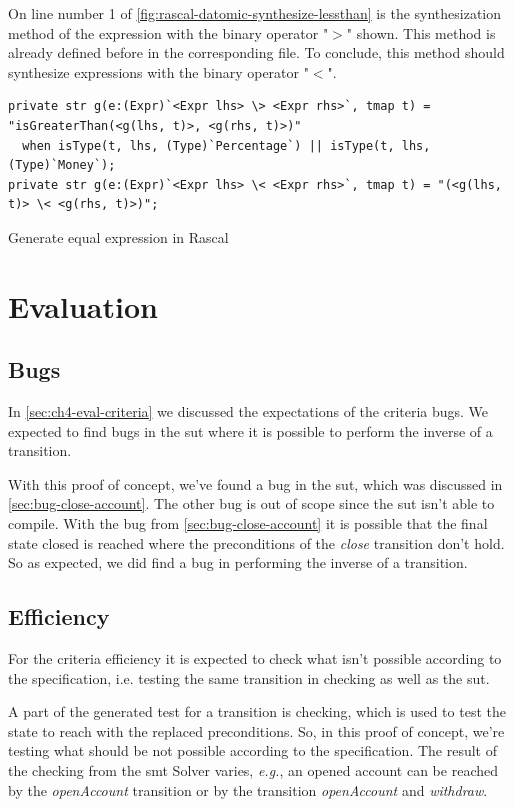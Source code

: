 On line number 1 of \autoref{fig:rascal-datomic-synthesize-lessthan} is the
synthesization method of the expression with the binary operator "$>$" shown.
This method is already defined before in the corresponding file. To conclude,
this method should synthesize expressions with the binary operator "$<$".

\begin{sourcecode}[h!]
\begin{lstlisting}[]
private str g(e:(Expr)`<Expr lhs> \> <Expr rhs>`, tmap t) = "isGreaterThan(<g(lhs, t)>, <g(rhs, t)>)"
  when isType(t, lhs, (Type)`Percentage`) || isType(t, lhs, (Type)`Money`);
private str g(e:(Expr)`<Expr lhs> \< <Expr rhs>`, tmap t) = "(<g(lhs, t)> \< <g(rhs, t)>)";
\end{lstlisting}
\caption{Generate equal expression in Rascal}\label{fig:rascal-datomic-synthesize-lessthan}
\end{sourcecode}
\FloatBarrier

\section{Evaluation}\label{sec:ch4-evaluation}

\subsection{Bugs}
In \autoref{sec:ch4-eval-criteria} we discussed the expectations of the criteria
bugs. We expected to find bugs in the \gls{sut} where it is possible to perform the
inverse of a transition.

With this proof of concept, we've found a bug in the \gls{sut}, which was
discussed in \autoref{sec:bug-close-account}. The other bug is out of scope
since the \gls{sut} isn't able to compile. With the bug from
\autoref{sec:bug-close-account} it is possible that the final state closed is
reached where the preconditions of the \textit{close} transition don't hold.
So as expected, we did find a bug in performing the inverse of a transition.

\subsection{Efficiency}
For the criteria efficiency it is expected to check what isn't possible
according to the specification, i.e. testing the same transition in checking as
well as the \gls{sut}.

A part of the generated test for a transition is checking, which is used to test
the state to reach with the replaced preconditions. So, in this proof of
concept, we're testing what should be not possible according to the
specification. The result of the checking from the \gls{smt} Solver varies,
\textit{e.g.}, an opened account can be reached by the \textit{openAccount}
transition or by the transition \textit{openAccount} and \textit{withdraw}.

